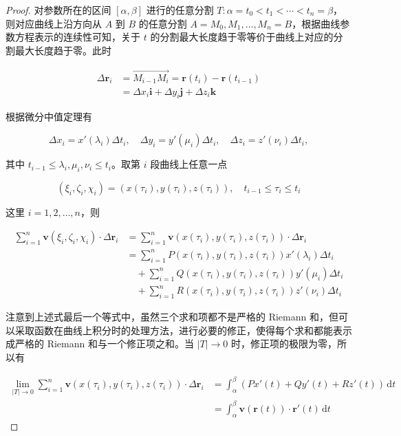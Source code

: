 \begin{proof}
    对参数所在的区间 $[\alpha, \beta]$ 进行的任意分割 $T: \alpha = t_0 < t_1 < \cdots < t_n = \beta$，则对应曲线上沿方向从 $A$ 到 $B$ 的任意分割 $A = M_0, M_1, \dots, M_n = B$，根据曲线参数方程表示的连续性可知，关于 $t$ 的分割最大长度趋于零等价于曲线上对应的分割最大长度趋于零。此时

\begin{align*}
\Delta \bm{r}_i &= \overrightarrow{M_{i-1} M_i} = \bm{r}(t_i) - \bm{r}(t_{i-1}) \\
&= \Delta x_i \bm{i} + \Delta y_i \bm{j} + \Delta z_i \bm{k}
\end{align*}

根据微分中值定理有

\[
\Delta x_i = x'(\lambda_i)\Delta t_i, \quad \Delta y_i = y'(\mu_i)\Delta t_i, \quad \Delta z_i = z'(\nu_i)\Delta t_i,
\]

其中 $t_{i-1} \leq \lambda_i, \mu_i, \nu_i \leq t_i$。取第 $i$ 段曲线上任意一点

\[
(\xi_i, \zeta_i, \chi_i) = (x(\tau_i), y(\tau_i), z(\tau_i)), \quad t_{i-1} \leq \tau_i \leq t_i
\]

这里 $i = 1,2,\dots,n$，则

\begin{align*}
\sum_{i=1}^n \bm{v}(\xi_i, \zeta_i, \chi_i) \cdot \Delta \bm{r}_i 
&= \sum_{i=1}^n \bm{v}(x(\tau_i), y(\tau_i), z(\tau_i)) \cdot \Delta \bm{r}_i \\
&= \sum_{i=1}^n P(x(\tau_i), y(\tau_i), z(\tau_i)) x'(\lambda_i) \Delta t_i \\
&\quad + \sum_{i=1}^n Q(x(\tau_i), y(\tau_i), z(\tau_i)) y'(\mu_i) \Delta t_i \\
&\quad + \sum_{i=1}^n R(x(\tau_i), y(\tau_i), z(\tau_i)) z'(\nu_i) \Delta t_i
\end{align*}

注意到上述式最后一个等式中，虽然三个求和项都不是严格的 Riemann 和，但可以采取函数在曲线上积分时的处理方法，进行必要的修正，使得每个求和都能表示成严格的 Riemann 和与一个修正项之和。当 $|T| \to 0$ 时，修正项的极限为零，所以有

\begin{align*}
\lim_{|T| \to 0} \sum_{i=1}^n \bm{v}(x(\tau_i), y(\tau_i), z(\tau_i)) \cdot \Delta \bm{r}_i 
&= \int_{\alpha}^{\beta} \left( P x'(t) + Q y'(t) + R z'(t) \right) \, \mathrm{d}t \\
&= \int_{\alpha}^{\beta} \bm{v}(\bm{r}(t)) \cdot \bm{r}'(t) \, \mathrm{d}t
\end{align*}
\end{proof}

